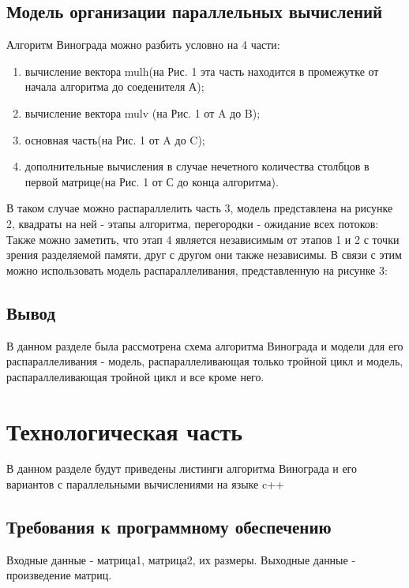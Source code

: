 \documentclass[a4paper, 14pt]{article}
\begin{document}
        \subsection{Модель организации параллельных вычислений}
        Алгоритм Винограда можно разбить условно на 4 части: 
        \begin{enumerate}
        \item вычисление вектора mulh(на Рис. 1 эта часть находится в промежутке от начала алгоритма до соеденителя А);
        \item вычисление вектора mulv (на Рис. 1 от A до B);
        \item основная часть(на Рис. 1 от A до C);
        \item дополнительные вычисления в случае нечетного количества столбцов в первой матрице(на Рис. 1 от С до конца алгоритма).
         \end{enumerate}
               
        В таком случае можно распараллелить часть 3, модель представлена на рисунке 2, квадраты на ней - этапы алгоритма, перегородки - ожидание всех потоков:\\ 

        
		Также можно заметить, что этап 4 является независимым от этапов 1 и 2 с точки зрения разделяемой памяти, друг с другом они также независимы. В связи с этим можно использовать модель распараллеливания, представленную на рисунке 3:\\
            
		
		
\subsection{Вывод}
		В данном разделе была рассмотрена схема алгоритма Винограда и модели для его распараллеливания - модель, распараллеливающая только тройной цикл и модель, распараллеливающая тройной цикл и все кроме него.\\
        
    	\newpage
        \section{Технологическая часть}
        
        В данном разделе будут приведены листинги алгоритма Винограда и его вариантов с параллельными вычислениями на языке c++\\
        \subsection{Требования к программному обеспечению}
        Входные данные - матрица1, матрица2, их размеры.
        Выходные данные - произведение матриц.
\end{document}
